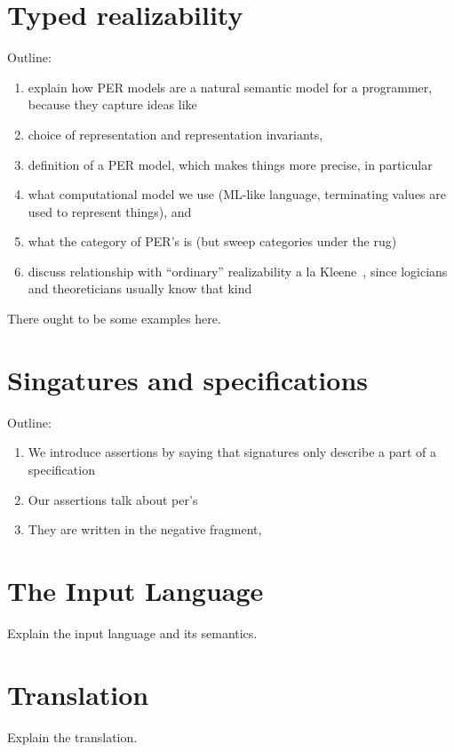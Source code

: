 \section{Typed realizability}
\label{sec:typed-realizability}

Outline:
%
\begin{enumerate}
\item explain how PER models are a natural semantic model for a
  programmer, because they capture ideas like
\item choice of representation and representation invariants,
\item definition of a PER model, which makes things more precise, in
  particular
\item what computational model we use (ML-like language, terminating
  values are used to represent things), and
\item what the category of PER's is (but sweep categories under the
  rug)
\item discuss relationship with ``ordinary'' realizability a la
  Kleene~\cite{KleeneSC:intint}, since logicians and theoreticians
  usually know that kind
\end{enumerate}

There ought to be some examples here.

\section{Singatures and specifications}
\label{sec:sing-spec}

Outline:
%
\begin{enumerate}
\item We introduce assertions by saying that signatures only describe a
  part of a specification
\item Our assertions talk about per's
\item They are written in the negative fragment,
\end{enumerate}


\section{The Input Language}
\label{sec:input-language}

Explain the input language and its semantics.

\section{Translation}
\label{sec:translation}

Explain the translation.




